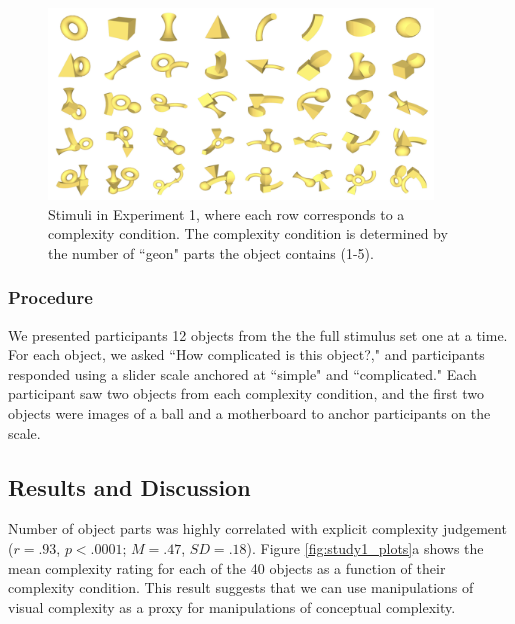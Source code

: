\documentclass[man]{apa2}
\begin{document}
\begin{figure} 
  \begin{center} 
    \includegraphics[height=2in]{figures/geon_stimuli.png} 
    \caption{\label{fig:geons} Stimuli in Experiment 1, where each row corresponds to a complexity condition. The complexity condition is determined by the number of ``geon" parts the object contains (1-5). } 
  \end{center} 
\end{figure}	

\subsubsection{Procedure}
We presented participants 12 objects from the the full stimulus set one at a time. For each object, we asked ``How complicated is this object?,"  and participants responded using a slider scale anchored at ``simple" and ``complicated." Each participant saw two objects from each complexity condition, and the first two objects were images of a ball and a motherboard to anchor participants on the scale.

\subsection{Results and Discussion}
Number of object parts was highly correlated with explicit complexity judgement ($r = .93$, $p < .0001$; $M = .47$,  $SD = .18$). Figure \ref{fig:study1_plots}a shows the mean complexity rating for each of the  40 objects as a function of their complexity condition. This result suggests that we can use manipulations of visual complexity as a proxy for manipulations of conceptual complexity. 
\end{document}
